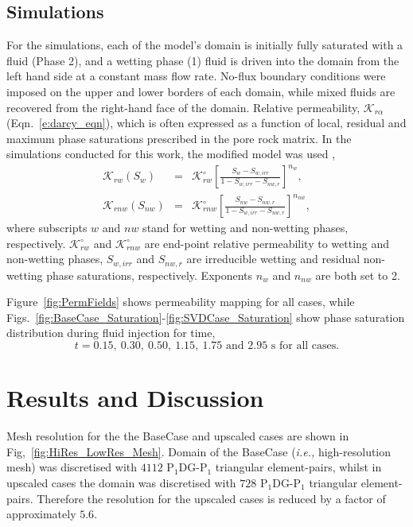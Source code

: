 \documentclass[preprint,12pt]{elsarticle}
\newcommand{\frc}{\displaystyle\frac}
\newcommand{\PN}[2][error]{P$_{#1}$DG-P$_{#2}$}
\newcommand{\ie}{{\it i.e., }}
\begin{document}
\subsection{Simulations}\label{subsection:simulations}
For the simulations, each of the model's domain is initially fully saturated with a fluid (Phase 2), and a wetting phase (1) fluid is driven into the domain from the left hand side at a constant mass flow rate. No-flux boundary conditions were imposed on the upper and lower borders of each domain, while mixed fluids are recovered from the right-hand face of the domain. Relative permeability, $\mathcal{K}_{r\alpha}$ (Eqn.~\ref{e:darcy_eqn}), which is often expressed as a function of local, residual and maximum phase saturations prescribed in the pore rock matrix. In the simulations conducted for this work, the modified \citet{Brooks_1964} model was used \citep{alpak_1999},
\begin{eqnarray}
  \mathcal{K}_{rw}\left(S_{w}\right) &=& \mathcal{K}^{\circ}_{rw}\left[\frc{S_{w}-S_{w,irr}}{1-S_{w,irr}-S_{nw,r}}\right]^{n_{w}}, \label{Eqn:CoreyBrooks1}\\
  \mathcal{K}_{rnw}\left(S_{nw}\right) &=& \mathcal{K}^{\circ}_{rnw}\left[\frc{S_{nw}-S_{nw,r}}{1-S_{w,irr}-S_{nw,r}}\right]^{n_{nw}}, \label{Eqn:CoreyBrooks2}
\end{eqnarray}
where subscripts $w$ and $nw$ stand for wetting and non-wetting phases, respectively. $\mathcal{K}^{\circ}_{rw}$ and $\mathcal{K}^{\circ}_{rnw}$ are end-point relative permeability to wetting and non-wetting phases, $S_{w,irr}$ and $S_{nw,r}$ are irreducible wetting and residual non-wetting phase saturations, respectively. Exponents $n_{w}$ and $n_{nw}$ are both set to 2.

Figure~\ref{fig:PermFields} shows permeability mapping for all cases, while Figs.~\ref{fig:BaseCase_Saturation}-\ref{fig:SVDCase_Saturation} show phase saturation distribution during fluid injection for time,
\begin{displaymath}
  t = 0.15,~0.30,~0.50,~1.15,~1.75\text{ and } 2.95 \text{ s for all cases.} 
\end{displaymath}

\section{Results and Discussion}\label{section:results_discussion}

Mesh resolution for the the BaseCase and upscaled cases are shown in Fig,~\ref{fig:HiRes_LowRes_Mesh}. Domain of the BaseCase (\ie high-resolution mesh) was discretised with $4112$ \PN[1]{1} triangular element-pairs, whilst in upscaled cases the domain was discretised with $728$ \PN[1]{1} triangular element-pairs. Therefore the resolution for the upscaled cases is reduced by a factor of approximately $5.6$.
\end{document}
